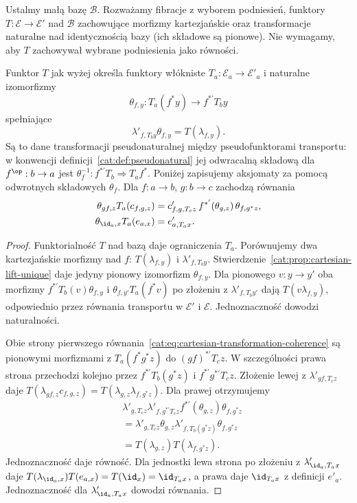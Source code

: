 Ustalmy małą bazę $\mathcal B$. Rozważamy fibracje z wyborem podniesień, funktory $T:\mathcal E\to\mathcal E'$ nad $\mathcal B$ zachowujące morfizmy kartezjańskie oraz transformacje naturalne nad identycznością bazy (ich składowe są pionowe). Nie wymagamy, aby $T$ zachowywał wybrane podniesienia jako równości.

\begin{stwierdzenie}\label{cat:prop:cartesian-functor-pseudonatural}
Funktor $T$ jak wyżej określa funktory włókniste $T_a:\mathcal E_a\to\mathcal E'_a$ i naturalne izomorfizmy
\[
 \theta_{f,y}:T_a(f^*y)\longrightarrow f^{*'}T_by
\]
spełniające
\[
 \lambda'_{f,T_by}\theta_{f,y}=T(\lambda_{f,y}).
\]
Są to dane transformacji pseudonaturalnej między pseudofunktorami transportu: w konwencji definicji~\ref{cat:def:pseudonatural} jej odwracalną składową dla $f^{\op}:b\to a$ jest $\theta_f^{-1}:f^{*'}T_b\Rightarrow T_af^*$. Poniżej zapisujemy aksjomaty za pomocą odwrotnych składowych $\theta_f$. Dla $f:a\to b$, $g:b\to c$ zachodzą równania
\begin{equation}\label{cat:eq:cartesian-transformation-coherence}
\begin{aligned}
 \theta_{gf,z}T_a(c_{f,g,z})
 &=c'_{f,g,T_cz}\,f^{*'}(\theta_{g,z})\,\theta_{f,g^*z},\\
 \theta_{\id_a,x}T_a(e_{a,x})&=e'_{a,T_ax}.
\end{aligned}
\end{equation}
\end{stwierdzenie}
\begin{proof}
Funktorialność $T$ nad bazą daje ograniczenia $T_a$. Porównujemy dwa kartezjańskie morfizmy nad $f$: $T(\lambda_{f,y})$ i $\lambda'_{f,T_by}$. Stwierdzenie~\ref{cat:prop:cartesian-lift-unique} daje jedyny pionowy izomorfizm $\theta_{f,y}$. Dla pionowego $v:y\to y'$ oba morfizmy $f^{*'}T_b(v)\theta_{f,y}$ i $\theta_{f,y'}T_a(f^*v)$ po złożeniu z $\lambda'_{f,T_by'}$ dają $T(v\lambda_{f,y})$, odpowiednio przez równania transportu w $\mathcal E'$ i $\mathcal E$. Jednoznaczność dowodzi naturalności.

Obie strony pierwszego równania~\eqref{cat:eq:cartesian-transformation-coherence} są pionowymi morfizmami z $T_a(f^*g^*z)$ do $(gf)^{*'}T_cz$. W szczególności prawa strona przechodzi kolejno przez $f^{*'}T_b(g^*z)$ i $f^{*'}g^{*'}T_cz$. Złożenie lewej z $\lambda'_{gf,T_cz}$ daje
$T(\lambda_{gf,z}c_{f,g,z})=T(\lambda_{g,z}\lambda_{f,g^*z})$.
Dla prawej otrzymujemy
\[
\begin{aligned}
 &\lambda'_{g,T_cz}\lambda'_{f,g^{*'}T_cz}
       f^{*'}(\theta_{g,z})\theta_{f,g^*z}\\
 &=\lambda'_{g,T_cz}\theta_{g,z}
       \lambda'_{f,T_b(g^*z)}\theta_{f,g^*z}\\
 &=T(\lambda_{g,z})T(\lambda_{f,g^*z}).
\end{aligned}
\]
Jednoznaczność daje równość. Dla jednostki lewa strona po złożeniu z $\lambda'_{\id_a,T_ax}$ daje $T(\lambda_{\id_a,x})T(e_{a,x})=T(\id_x)=\id_{T_ax}$, a prawa daje $\id_{T_ax}$ z definicji $e'_a$. Jednoznaczność dla $\lambda'_{\id_a,T_ax}$ dowodzi równania.
\end{proof}

